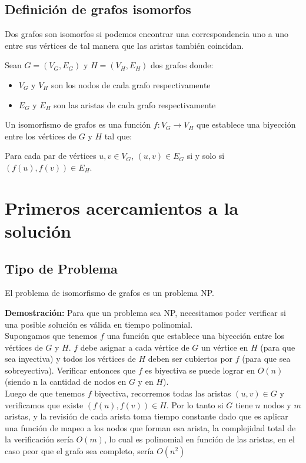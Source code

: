 \documentclass{article}
\begin{document}
\subsection{Definición de grafos isomorfos} 

Dos grafos son isomorfos si podemos encontrar una correspondencia uno a uno entre sus vértices de tal manera que las aristas también coincidan.

Sean $G = (V_G,E_G)$ y $H = (V_H,E_H)$ dos grafos donde:
\begin{itemize}
\item {$V_G$ y $V_H$ son los nodos de cada grafo respectivamente}
\item {$E_G$ y $E_H$ son las aristas de cada grafo respectivamente}
\end{itemize}

Un isomorfismo de grafos es una función $f:V_G \rightarrow V_H$ que establece una biyección entre los vértices de $G$ y $H$ tal que: 

Para cada par de vértices $u,v \in V_G$, $(u,v)\in E_G$ si y solo si $(f(u),f(v))\in E_H$.

\section{Primeros acercamientos a la solución}
\subsection*{Tipo de Problema}

El problema de isomorfismo de grafos es un problema NP.

\textbf{Demostración:} Para que un problema sea NP, necesitamos poder verificar si una posible solución es válida en tiempo polinomial.\\
Supongamos que tenemos $f$ una función que establece una biyección entre los vértices de $G$ y $H$. $f$ debe asignar a cada vértice de $G$ un vértice en $H$ (para que sea inyectiva) y todos los vértices de $H$ deben ser cubiertos por $f$ (para que sea sobreyectiva). Verificar entonces que $f$ es biyectiva se puede lograr en $O(n)$ (siendo n la cantidad de nodos en $G$ y en $H$).\\
Luego de que tenemos $f$ biyectiva, recorremos todas las aristas $(u,v) \in G$ y verificamos que existe $(f(u),f(v)) \in H$. Por lo tanto si $G$ tiene $n$ nodos y $m$ aristas, y la revisión de cada arista toma tiempo constante dado que es aplicar una función de mapeo a los nodos que forman esa arista, la complejidad total de la verificación sería $O(m)$, lo cual es polinomial en función de las aristas, en el caso peor que el grafo sea completo, sería $O(n^2)$
\end{document}
